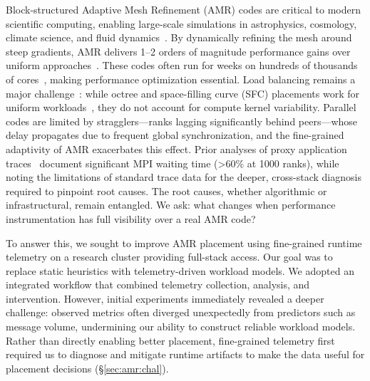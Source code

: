 
Block-structured Adaptive Mesh Refinement (AMR) codes are critical to modern scientific computing,
enabling large-scale simulations in astrophysics, cosmology, climate science, and fluid
dynamics~\cite{Dubey2014:Survey, Burst2011:p4est}.
By dynamically refining the mesh around steep gradients, AMR delivers 1--2 orders of magnitude
performance gains over uniform approaches~\cite{Vitti:DecadeAMR}.
These codes often run for weeks on hundreds of thousands of
cores~\cite{Liska2022:H-AMR,Burst2011:p4est,Grete2023:Parthenon}, making performance optimization
essential.
Load balancing remains a major challenge~\cite{Dubey2014:Survey,Burst2008:ALPS}: while octree and
space-filling curve (SFC) placements work for uniform workloads~\cite{Burst2011:p4est}, they do not
account for compute kernel variability.
Parallel codes are limited by stragglers---ranks lagging significantly behind peers---whose
delay propagates due to frequent global synchronization, and the fine-grained adaptivity of AMR
exacerbates this effect.
Prior analyses of proxy application traces~\cite{Klenk2017:OverviewMPICharacteristics} document
significant MPI waiting time (\textgreater{}60\% at 1000 ranks), while noting the limitations of
standard trace data for the deeper, cross-stack diagnosis required to pinpoint root causes.
The root causes, whether algorithmic or infrastructural, remain entangled.
We ask: what changes when performance instrumentation has full visibility over a real AMR code?

To answer this, we sought to improve AMR placement using fine-grained runtime telemetry on a
research cluster providing full-stack access.
Our goal was to replace static heuristics with telemetry-driven workload models.
We adopted an integrated workflow that combined telemetry collection, analysis, and intervention.
However, initial experiments immediately revealed a deeper challenge: observed metrics often
diverged unexpectedly from predictors such as message volume, undermining our ability to construct
reliable workload models.
Rather than directly enabling better placement, fine-grained telemetry first required us to
diagnose and mitigate runtime artifacts to make the data useful for placement decisions
(\S\ref{sec:amr:chal}).

